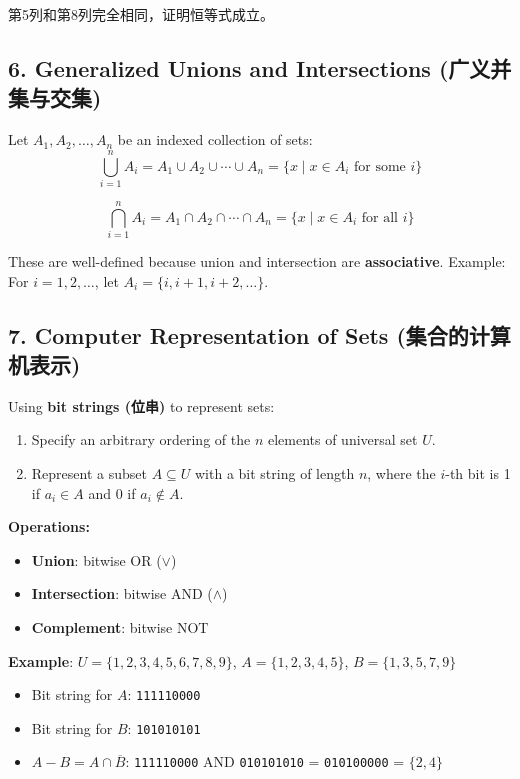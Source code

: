 \documentclass[10pt,a4paper,openany]{ctexbook}
\theoremstyle{definition}
\theoremstyle{remark}
\begin{document}
第5列和第8列完全相同，证明恒等式成立。
\vspace{-2pt}

\subsection{6. Generalized Unions and Intersections (广义并集与交集)}

Let $A_1, A_2, \dots, A_n$ be an indexed collection of sets:
\[
\bigcup_{i=1}^{n} A_i = A_1 \cup A_2 \cup \cdots \cup A_n = \{x \mid x \in A_i \text{ for some } i\}
\]

\[
\bigcap_{i=1}^{n} A_i = A_1 \cap A_2 \cap \cdots \cap A_n = \{x \mid x \in A_i \text{ for all } i\}
\]

These are well-defined because union and intersection are \textbf{associative}.
Example: For $i = 1,2,\dots$, let $A_i = \{i, i+1, i+2, \dots\}$.
\vspace{-2pt}

\subsection{7. Computer Representation of Sets (集合的计算机表示)}

Using \textbf{bit strings (位串)} to represent sets:
\begin{enumerate}
\item Specify an arbitrary ordering of the $n$ elements of universal set $U$.
\item Represent a subset $A \subseteq U$ with a bit string of length $n$, where the $i$-th bit is 1 if $a_i \in A$ and 0 if $a_i \notin A$.

\end{enumerate}

\textbf{Operations:}
\begin{itemize}
\item \textbf{Union}: bitwise OR ($\lor$)
\item \textbf{Intersection}: bitwise AND ($\land$)
\item \textbf{Complement}: bitwise NOT

\end{itemize}

\textbf{Example}: $U = \{1,2,3,4,5,6,7,8,9\}$, $A = \{1,2,3,4,5\}$, $B = \{1,3,5,7,9\}$
\begin{itemize}
\item Bit string for $A$: \texttt{111110000}
\item Bit string for $B$: \texttt{101010101}
\item $A - B = A \cap \overline{B}$: \texttt{111110000} AND \texttt{010101010} = \texttt{010100000} = $\{2,4\}$

\end{itemize}
\end{document}
